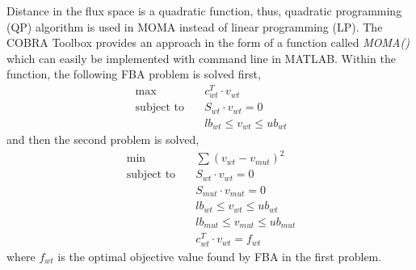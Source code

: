 Distance in the flux space is a quadratic function, thus, quadratic programming (QP) algorithm is used in MOMA instead of linear programming (LP). The COBRA Toolbox provides an approach in the form of a function called \emph{MOMA()} which can easily be implemented with command line in MATLAB. Within the function, the following FBA problem is solved first,
\begin{align}
 \ \text{max} \quad & c^T_{wt} \cdot v_{wt} \\
 \label{eq:moma_1}
 \ \text{subject to} \quad & S_{wt} \cdot v_{wt}=0 \\
 \ & lb_{wt} \leq v_{wt} \leq ub_{wt}
\end{align}
and then the second problem is solved,
\begin{align}
 \ \text{min} \quad & \sum (v_{wt} - v_{mut})^2\\
 \label{eq:moma_2}
 \ \text{subject to} \quad & S_{wt} \cdot v_{wt}=0 \\
 \ & S_{mut} \cdot v_{mut}=0 \\
 \ & lb_{wt} \leq v_{wt} \leq ub_{wt} \\
 \ & lb_{mut} \leq v_{mut} \leq ub_{mut} \\
 \ & c^T_{wt} \cdot v_{wt} = f_{wt}
\end{align}
\noindent
where $f_{wt}$ is the optimal objective value found by FBA in the first problem.
